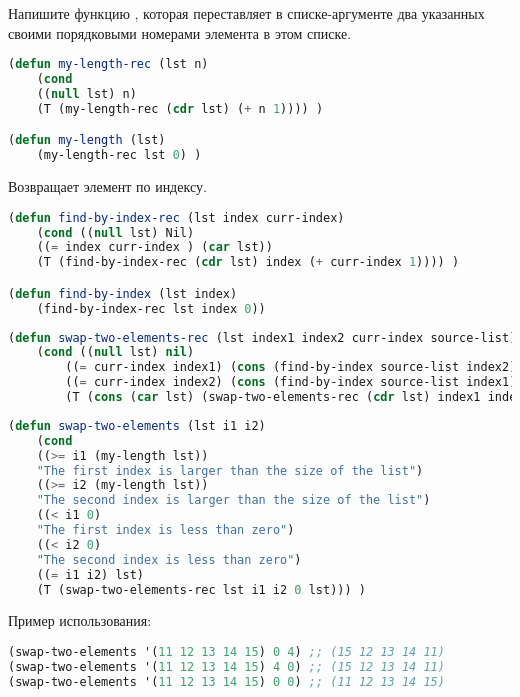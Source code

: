 \documentclass[a4paper,oneside,12pt]{extreport}
\begin{document}
\begin{task}
	Напишите функцию , которая переставляет в списке-аргументе
    два указанных своими порядковыми номерами элемента в этом списке.

    \begin{lstlisting}[language=Lisp]
(defun my-length-rec (lst n)
    (cond 
    ((null lst) n)
    (T (my-length-rec (cdr lst) (+ n 1)))) )	

(defun my-length (lst)	
    (my-length-rec lst 0) )
    \end{lstlisting}

    Возвращает элемент по индексу.
    \begin{lstlisting}[language=Lisp]
(defun find-by-index-rec (lst index curr-index) 
    (cond ((null lst) Nil)
    ((= index curr-index ) (car lst))
    (T (find-by-index-rec (cdr lst) index (+ curr-index 1)))) )

(defun find-by-index (lst index) 
    (find-by-index-rec lst index 0))
    \end{lstlisting}

    \begin{lstlisting}[language=Lisp]
(defun swap-two-elements-rec (lst index1 index2 curr-index source-list)
    (cond ((null lst) nil)
        ((= curr-index index1) (cons (find-by-index source-list index2) (swap-two-elements-rec (cdr lst) index1 index2 (+ curr-index 1) source-list)))
        ((= curr-index index2) (cons (find-by-index source-list index1) (swap-two-elements-rec (cdr lst) index1 index2 (+ curr-index 1) source-list)))
        (T (cons (car lst) (swap-two-elements-rec (cdr lst) index1 index2 (+ curr-index 1) source-list) )) ) )
    \end{lstlisting}

    \begin{lstlisting}[language=Lisp]
(defun swap-two-elements (lst i1 i2)
    (cond 
    ((>= i1 (my-length lst)) 
    "The first index is larger than the size of the list")
    ((>= i2 (my-length lst)) 
    "The second index is larger than the size of the list")
    ((< i1 0) 
    "The first index is less than zero")
    ((< i2 0) 
    "The second index is less than zero")
    ((= i1 i2) lst)
    (T (swap-two-elements-rec lst i1 i2 0 lst))) )    
    \end{lstlisting}

    Пример использования:
    \begin{lstlisting}[language=Lisp]
(swap-two-elements '(11 12 13 14 15) 0 4) ;; (15 12 13 14 11)
(swap-two-elements '(11 12 13 14 15) 4 0) ;; (15 12 13 14 11)
(swap-two-elements '(11 12 13 14 15) 0 0) ;; (11 12 13 14 15)
    \end{lstlisting}

\end{task}
\end{document}
